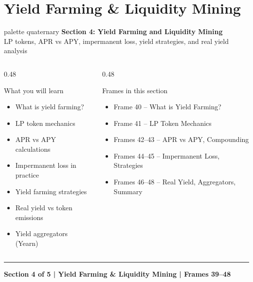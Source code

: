 \documentclass[8pt,aspectratio=169]{beamer}
\newcommand{\bottomnote}[1]{\vfill\vspace{-2mm}\textcolor{mllavender2}{\rule{\textwidth}{0.4pt}}\vspace{1mm}\footnotesize\textbf{#1}}
\begin{document}

\section{Yield Farming \& Liquidity Mining}

\begin{frame}
  \begin{beamercolorbox}[sep=12pt,center,rounded=true,shadow=true]{palette quaternary}
    {\Large\bfseries Section 4: Yield Farming and Liquidity Mining}\\{}\vspace{6pt}
    {\normalsize LP tokens, APR vs APY, impermanent loss, yield strategies, and real yield analysis}
  \end{beamercolorbox}
  \vspace{8mm}
  \begin{columns}[T]
    \begin{column}{0.48\textwidth}
      \begin{block}{What you will learn}
        \begin{itemize}\setlength\itemsep{2pt}
          \item What is yield farming?
          \item LP token mechanics
          \item APR vs APY calculations
          \item Impermanent loss in practice
          \item Yield farming strategies
          \item Real yield vs token emissions
          \item Yield aggregators (Yearn)
        \end{itemize}
      \end{block}
    \end{column}
    \begin{column}{0.48\textwidth}
      \begin{block}{Frames in this section}
        \begin{itemize}\setlength\itemsep{2pt}
          \item Frame 40 -- What is Yield Farming?
          \item Frame 41 -- LP Token Mechanics
          \item Frames 42--43 -- APR vs APY, Compounding
          \item Frames 44--45 -- Impermanent Loss, Strategies
          \item Frames 46--48 -- Real Yield, Aggregators, Summary
        \end{itemize}
      \end{block}
    \end{column}
  \end{columns}
  \bottomnote{Section 4 of 5 | Yield Farming \& Liquidity Mining | Frames 39--48}
\end{frame}
\end{document}
